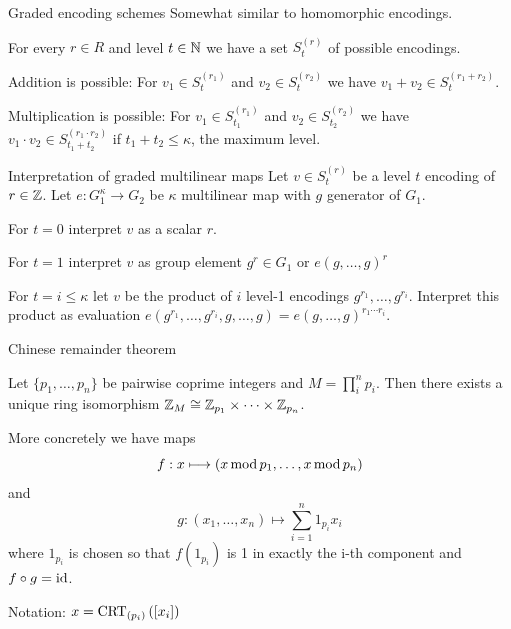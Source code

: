 \documentclass[english]{beamer}
\begin{document}
    \begin{frame}{Graded encoding schemes}
        Somewhat similar to homomorphic encodings.

        For every $r \in R$ and level $t \in \mathbb{N}$ we have a set $S^{(r)}_t$ of possible encodings.

        Addition is possible: For $v_1 \in S^{(r_1)}_t$ and $v_2 \in S^{(r_2)}_t$ we have $v_1 + v_2 \in S^{(r_1 + r_2)}_t$.

        Multiplication is possible: For $v_1 \in S^{(r_1)}_{t_1}$ and $v_2 \in S^{(r_2)}_{t_2}$ we have $v_1 \cdot v_2 \in S^{(r_1 \cdot r_2)}_{t_1 + t_2}$ if $t_1 + t_2 \leq \kappa$, the maximum level.
    \end{frame}
    \begin{frame}{Interpretation of graded multilinear maps}
        Let $v \in S^{(r)}_t$ be a level $t$ encoding of $r \in \mathbb{Z}$. Let $e: G_1^\kappa \rightarrow G_2$ be $\kappa$ multilinear map with $g$ generator of $G_1$.

        For $t = 0$ interpret $v$ as a scalar $r$.

        For $t = 1$ interpret $v$ as group element $g^r \in G_1$ or $e(g, \dots, g)^r$
        \pause

        For $t = i \leq \kappa$ let $v$ be the product of $i$ level-1 encodings $g^{r_1}, \dots, g^{r_i}$. Interpret this product as evaluation $e(g^{r_1}, \dots, g^{r_i}, g, \dots, g) = e(g, \dots, g)^{r_1\cdots r_i}$.
    \end{frame}
    \begin{frame}{Chinese remainder theorem}
        \begin{theorem}
            Let $\{p_1, \dots, p_n\}$ be pairwise coprime integers and $M = \prod_i^n p_i$. Then there exists a unique ring isomorphism $\mathbb{Z}_M \cong \mathbb{Z}_{p_1} \times \dots \times \mathbb{Z}_{p_n}$.
        \end{theorem}

        More concretely we have maps
        \begin{equation*}
            f : x \longmapsto (x \operatorname{mod} p_1, \dots, x \operatorname{mod} p_n)
        \end{equation*}
        and
        \begin{equation*}
            g : (x_1, \dots, x_n) \longmapsto \sum_{i=1}^n 1_{p_i}x_i
        \end{equation*}
        where $1_{p_i}$ is chosen so that $f\left(1_{p_i}\right)$ is 1 in exactly the i-th component and $f \circ g = \operatorname{id}$.

        Notation: $x = \operatorname{CRT}_{(p_{i})}\left(\left[x_i\right]\right)$
    \end{frame}
\end{document}
